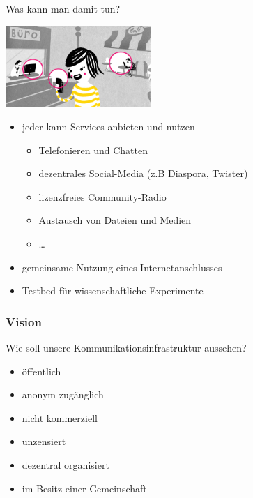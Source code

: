 \documentclass[handout, 10pt]{beamer}
\begin{document}
\begin{frame}{Was kann man damit tun?}
	\vfill
	\begin{center}
		\includegraphics[width=5.5cm]{images/verbindet}
	\end{center}
	
	\begin{itemize}[<+->]
		\item jeder kann Services anbieten und nutzen
		\begin{itemize}
			\item Telefonieren und Chatten
			\item dezentrales Social-Media (z.B Diaspora, Twister)
			\item lizenzfreies Community-Radio
			\item Austausch von Dateien und Medien
			\item \ldots
		\end{itemize}
		\item gemeinsame Nutzung eines Internetanschlusses
		\item Testbed f\"ur wissenschaftliche Experimente
	\end{itemize}
	\vfill
\end{frame}

\begin{frame}
	\frametitle{Vision}
	
	Wie soll unsere Kommunikationsinfrastruktur aussehen?
	
	\begin{itemize}[<+->]
		\item öffentlich
		\item anonym zugänglich
		\item nicht kommerziell
		\item unzensiert
		\item dezentral organisiert
		\item im Besitz einer Gemeinschaft
	\end{itemize}
\end{frame}
\end{document}
